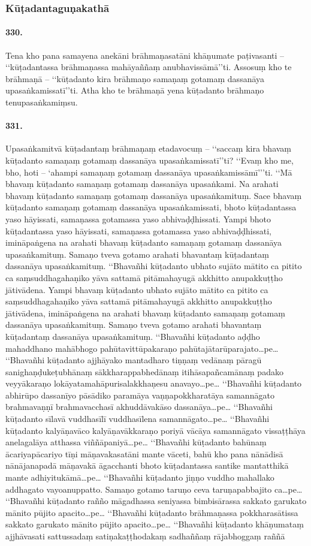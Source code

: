 \subsubsection{Kūṭadantaguṇakathā}

\paragraph{330.} Tena kho pana samayena anekāni brāhmaṇasatāni khāṇumate paṭivasanti – ‘‘kūṭadantassa brāhmaṇassa mahāyaññaṃ anubhavissāmā’’ti. Assosuṃ kho te brāhmaṇā – ‘‘kūṭadanto kira brāhmaṇo samaṇaṃ gotamaṃ dassanāya upasaṅkamissatī’’ti. Atha kho te brāhmaṇā yena kūṭadanto brāhmaṇo tenupasaṅkamiṃsu.

\paragraph{331.} Upasaṅkamitvā kūṭadantaṃ brāhmaṇaṃ etadavocuṃ – ‘‘saccaṃ kira bhavaṃ kūṭadanto samaṇaṃ gotamaṃ dassanāya upasaṅkamissatī’’ti? ‘‘Evaṃ kho me, bho, hoti – ‘ahampi samaṇaṃ gotamaṃ dassanāya upasaṅkamissāmī’’’ti. ‘‘Mā bhavaṃ kūṭadanto samaṇaṃ gotamaṃ dassanāya upasaṅkami. Na arahati bhavaṃ kūṭadanto samaṇaṃ gotamaṃ dassanāya upasaṅkamituṃ. Sace bhavaṃ kūṭadanto samaṇaṃ gotamaṃ dassanāya upasaṅkamissati, bhoto kūṭadantassa yaso hāyissati, samaṇassa gotamassa yaso abhivaḍḍhissati. Yampi bhoto kūṭadantassa yaso hāyissati, samaṇassa gotamassa yaso abhivaḍḍhissati, imināpaṅgena na arahati bhavaṃ kūṭadanto samaṇaṃ gotamaṃ dassanāya upasaṅkamituṃ. Samaṇo tveva gotamo arahati bhavantaṃ kūṭadantaṃ dassanāya upasaṅkamituṃ. ‘‘Bhavañhi kūṭadanto ubhato sujāto mātito ca pitito ca saṃsuddhagahaṇiko yāva sattamā pitāmahayugā akkhitto anupakkuṭṭho jātivādena. Yampi bhavaṃ kūṭadanto ubhato sujāto mātito ca pitito ca saṃsuddhagahaṇiko yāva sattamā pitāmahayugā akkhitto anupakkuṭṭho jātivādena, imināpaṅgena na arahati bhavaṃ kūṭadanto samaṇaṃ gotamaṃ dassanāya upasaṅkamituṃ. Samaṇo tveva gotamo arahati bhavantaṃ kūṭadantaṃ dassanāya upasaṅkamituṃ. ‘‘Bhavañhi kūṭadanto aḍḍho mahaddhano mahābhogo pahūtavittūpakaraṇo pahūtajātarūparajato…pe… ‘‘Bhavañhi kūṭadanto ajjhāyako mantadharo tiṇṇaṃ vedānaṃ pāragū sanighaṇḍukeṭubhānaṃ sākkharappabhedānaṃ itihāsapañcamānaṃ padako veyyākaraṇo lokāyatamahāpurisalakkhaṇesu anavayo…pe… ‘‘Bhavañhi kūṭadanto abhirūpo dassanīyo pāsādiko paramāya vaṇṇapokkharatāya samannāgato brahmavaṇṇī brahmavacchasī akhuddāvakāso dassanāya…pe… ‘‘Bhavañhi kūṭadanto sīlavā vuddhasīlī vuddhasīlena samannāgato…pe… ‘‘Bhavañhi kūṭadanto kalyāṇavāco kalyāṇavākkaraṇo poriyā vācāya samannāgato vissaṭṭhāya anelagalāya atthassa viññāpaniyā…pe… ‘‘Bhavañhi kūṭadanto bahūnaṃ ācariyapācariyo tīṇi māṇavakasatāni mante vāceti, bahū kho pana nānādisā nānājanapadā māṇavakā āgacchanti bhoto kūṭadantassa santike mantatthikā mante adhiyitukāmā…pe… ‘‘Bhavañhi kūṭadanto jiṇṇo vuddho mahallako addhagato vayoanuppatto. Samaṇo gotamo taruṇo ceva taruṇapabbajito ca…pe… ‘‘Bhavañhi kūṭadanto rañño māgadhassa seniyassa bimbisārassa sakkato garukato mānito pūjito apacito…pe… ‘‘Bhavañhi kūṭadanto brāhmaṇassa pokkharasātissa sakkato garukato mānito pūjito apacito…pe… ‘‘Bhavañhi kūṭadanto khāṇumataṃ ajjhāvasati sattussadaṃ satiṇakaṭṭhodakaṃ sadhaññaṃ rājabhoggaṃ raññā 